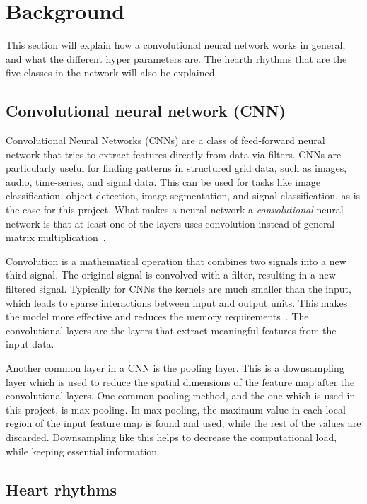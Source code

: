 \section{Background}

This section  will explain how a convolutional neural network works in general, and what the different hyper parameters are. The hearth rhythms that are the five classes in the network will also be explained. 

\subsection{Convolutional neural network (CNN)}\label{subsec:CNNtheory}
Convolutional Neural Networks (CNNs) are a class of feed-forward neural network that tries to extract features directly from data via filters. CNNs are particularly useful for finding patterns in structured grid data, such as images, audio, time-series, and signal data. This can be used for tasks like image classification, object detection, image segmentation, and signal classification, as is the case for this project. What makes a neural network a \textit{convolutional} neural network is that at least one of the layers uses convolution instead of general matrix multiplication~\cite{deeplearning}.

Convolution is a mathematical operation that combines two signals into a new third signal. The original signal is convolved with a filter, resulting in a new filtered signal. Typically for CNNs the kernels are much smaller than the input, which leads to sparse interactions between input and output units. This makes the model more effective and reduces the memory requirements~\cite{deeplearning}. The convolutional layers are the layers that extract meaningful features from the input data. 

Another common layer in a CNN is the pooling layer. This is a downsampling layer which is used to reduce the spatial dimensions of the feature map after the convolutional layers. One common pooling method, and the one which is used in this project, is max pooling. In max pooling, the maximum value in each local region of the input feature map is found and used, while the rest of the values are discarded. Downsampling like this helps to decrease the computational load, while keeping essential information.


\subsection{Heart rhythms} \label{subsec:heartrhythm}

